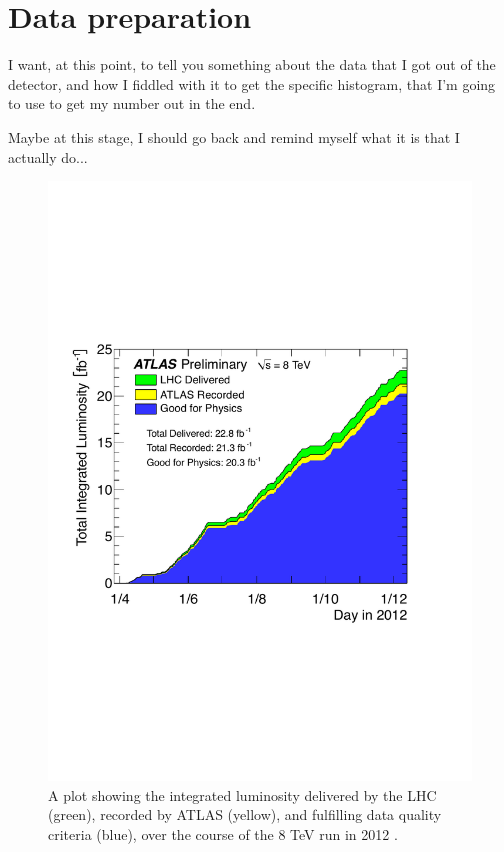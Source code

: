 \chapter{Data preparation}

I want, at this point, to tell you something about the data that I got out of the detector, and how I fiddled with it to get the specific histogram, that I'm going to use to get my number out in the end.

Maybe at this stage, I should go back and remind myself what it is that I actually do...

\begin{figure}[htp]
\begin{minipage}[b]{.69\textwidth}
\hspace{-1em}\includegraphics[width=\textwidth]{figures/intlumi}
\end{minipage}\hfill\begin{minipage}[b]{.3\textwidth}
\caption{A plot showing the integrated luminosity delivered by the LHC (green), recorded by ATLAS (yellow), and fulfilling data quality criteria (blue), over the course of the 8 TeV run in 2012 \cite{publiclumi}.
\label{intlumi}}
\end{minipage}
\end{figure}

